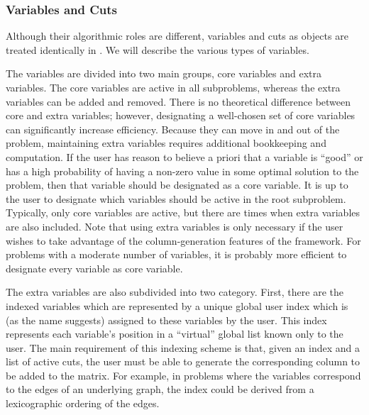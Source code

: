 
\subsubsection{Variables and Cuts}
\label{variables-cuts}

Although their algorithmic roles are different, variables and cuts as objects
are treated identically in \BB. We will describe the various types of
variables.

The variables are divided into two main groups, core variables and extra
variables. The core variables are active in all subproblems, whereas the extra
variables can be added and removed. There is no theoretical difference between
core and extra variables; however, designating a well-chosen set of core
variables can significantly increase efficiency. Because they can move in and
out of the problem, maintaining extra variables requires additional
bookkeeping and computation. If the user has reason to believe a priori that a
variable is ``good'' or has a high probability of having a non-zero value in
some optimal solution to the problem, then that variable should be designated
as a core variable. It is up to the user to designate which variables should
be active in the root subproblem. Typically, only core variables are active,
but there are times when extra variables are also included. Note that using
extra variables is only necessary if the user wishes to take advantage of the
column-generation features of the framework. For problems with a moderate
number of variables, it is probably more efficient to designate every variable
as core variable.

The extra variables are also subdivided into two category. First, there are
the indexed variables which are represented by a unique global user index
which is (as the name suggests) assigned to these variables by the user. This
index represents each variable's position in a ``virtual'' global list known
only to the user. The main requirement of this indexing scheme is that, given
an index and a list of active cuts, the user must be able to generate the
corresponding column to be added to the matrix. For example, in problems
where the variables correspond to the edges of an underlying graph, the index
could be derived from a lexicographic ordering of the edges.

